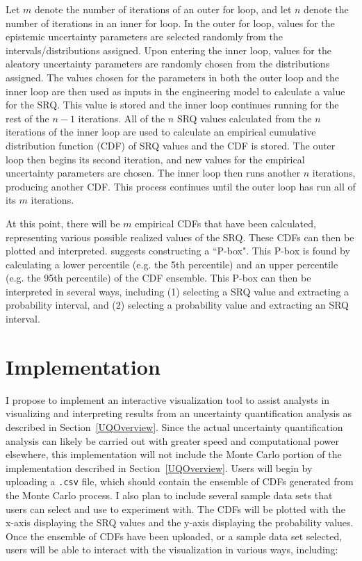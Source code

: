 \documentclass[11pt]{asaproc}\usepackage[]{graphicx}\usepackage[]{color}
\begin{document}
Let $m$ denote the number of iterations of an outer for loop, and let $n$ denote the number of iterations in an inner for loop. In the outer for loop, values for the epistemic uncertainty parameters are selected randomly from the intervals/distributions assigned. Upon entering the inner loop, values for the aleatory uncertainty parameters are randomly chosen from the distributions assigned. The values chosen for the parameters in both the outer loop and the inner loop are then used as inputs in the engineering model to calculate a value for the SRQ. This value is stored and the inner loop continues running for the rest of the $n-1$ iterations. All of the $n$ SRQ values calculated from the $n$ iterations of the inner loop are used to calculate an empirical cumulative distribution function (CDF) of SRQ values and the CDF is stored. The outer loop then begins its second iteration, and new values for the empirical uncertainty parameters are chosen. The inner loop then runs another $n$ iterations, producing another CDF. This process continues until the outer loop has run all of its $m$ iterations. 

At this point, there will be $m$ empirical CDFs that have been calculated, representing various possible realized values of the SRQ. These CDFs can then be plotted and interpreted. \cite{EW2018} suggests constructing a ``P-box". This P-box is found by calculating a lower percentile (e.g. the 5th percentile) and an upper percentile (e.g. the 95th percentile) of the CDF ensemble. This P-box can then be interpreted in several ways, including (1) selecting a SRQ value and extracting a probability interval, and (2) selecting a probability value and extracting an SRQ interval.

\section{Implementation}  
\label{Implementation}

I propose to implement an interactive visualization tool to assist analysts in visualizing and interpreting results from an uncertainty quantification analysis as described in Section~\ref{UQOverview}. Since the actual uncertainty quantification analysis can likely be carried out with greater speed and computational power elsewhere, this implementation will not include the Monte Carlo portion of the implementation described in Section~\ref{UQOverview}. Users will begin by uploading a {\tt .csv} file, which should contain the ensemble of CDFs generated from the Monte Carlo process. I also plan to include several sample data sets that users can select and use to experiment with. The CDFs will be plotted with the x-axis displaying the SRQ values and the y-axis displaying the probability values. Once the ensemble of CDFs have been uploaded, or a sample data set selected, users will be able to interact with the visualization in various ways, including:
\end{document}
